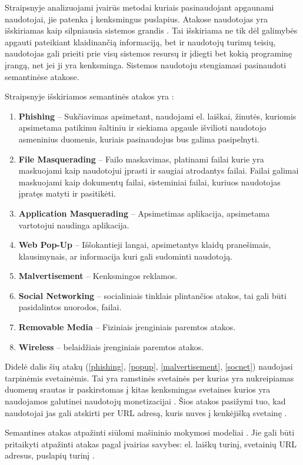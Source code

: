 Straipsnyje  analizuojami įvairūs metodai kuriais pasinaudojant apgaunami naudotojai, jie patenka į kenksmingus puslapius. Atakose naudotojas yra išskiriamas kaip silpniausia sistemos grandis \cite{tax}. Tai išskiriama ne tik dėl galimybės apgauti pateikiant klaidinančią informaciją, bet ir naudotojų turimų teisių, naudotojas gali prieiti prie visų sistemos resursų ir įdiegti bet kokią programinę įrangą, net jei ji yra kenksminga. Sistemos naudotoju stengiamasi pasinaudoti semantinėse atakose.

Straipsnyje išskiriamos semantinės atakos yra \cite{tax}:
\begin{enumerate}
    \item \label{phishing} \textbf{Phishing} -- Sukčiavimas apsimetant, naudojami el. laiškai, žinutės, kuriomis apsimetama patikimu šaltiniu ir siekiama apgaule išvilioti naudotojo asmeninius duomenis, kuriais pasinaudojus bus galima pasipelnyti.
    \item \textbf{File Masquerading} -- Failo maskavimas, platinami failai kurie yra maskuojami kaip naudotojui įprasti ir saugiai atrodantys failai. Failai galimai maskuojami kaip dokumentų failai, sisteminiai failai, kuriuos naudotojas įpratęs matyti ir pasitikėti.
    \item \textbf{Application Masquerading} -- Apsimetimas aplikacija, apsimetama vartotojui naudinga aplikacija.
    \item \label{popup} \textbf{Web Pop-Up} -- Iššokantieji langai, apsimetantys klaidų pranešimais, klausimynais, ar informacija kuri gali sudominti naudotoją.
    \item \label{malvertisement}\textbf{Malvertisement} -- Kenksmingos reklamos.
    \item \label{socnet}\textbf{Social Networking} -- socialiniais tinklais plintančios atakos, tai gali būti pasidalintos nuorodos, failai.
    \item \textbf{Removable Media} -- Fiziniais įrenginiais paremtos atakos.
    \item \textbf{Wireless} -- belaidžiais įrenginiais paremtos atakos.
\end{enumerate}
Didelė dalis šių atakų (\ref{phishing}, \ref{popup}, \ref{malvertisement}, \ref{socnet}) naudojasi tarpinėmis svetainėmis. Tai yra ramstinės svetainės per kurias yra nukreipiamas duomenų srautas ir paskirstomas į kitas kenksmingas svetaines kurios yra naudojamos galutinei naudotojų monetizacijai \cite{linchpins}. Šios atakos pasižymi tuo, kad naudotojai jas gali atskirti per URL adresą, kuris nuves į kenkėjišką svetainę \cite{tax}.

Semantines atakas atpažinti siūlomi mašininio mokymosi modeliai \cite{tax}. Jie gali būti pritaikyti atpažinti atakas pagal įvairias savybes: el. laiškų turinį, svetainių URL adresus, puslapių turinį \cite{tax}.